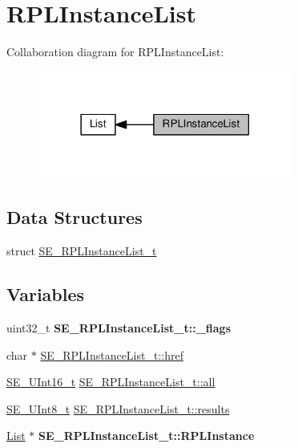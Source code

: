 \hypertarget{group__RPLInstanceList}{}\section{R\+P\+L\+Instance\+List}
\label{group__RPLInstanceList}
Collaboration diagram for R\+P\+L\+Instance\+List\+:\nopagebreak
\begin{figure}[H]
\begin{center}
\leavevmode
\includegraphics[width=237pt]{group__RPLInstanceList}
\end{center}
\end{figure}
\subsection*{Data Structures}
\begin{DoxyCompactItemize}
\item 
struct \hyperlink{structSE__RPLInstanceList__t}{S\+E\+\_\+\+R\+P\+L\+Instance\+List\+\_\+t}
\end{DoxyCompactItemize}
\subsection*{Variables}
\begin{DoxyCompactItemize}
\item 
\mbox{\label{group__RPLInstanceList_ga2f1292a8c00b7933ab76efb20bd4c02b}} 
uint32\+\_\+t {\bfseries S\+E\+\_\+\+R\+P\+L\+Instance\+List\+\_\+t\+::\+\_\+flags}
\item 
char $\ast$ \hyperlink{group__RPLInstanceList_ga5fd981ad39b39f7c4b6b6353ea9c322f}{S\+E\+\_\+\+R\+P\+L\+Instance\+List\+\_\+t\+::href}
\item 
\hyperlink{group__UInt16_gac68d541f189538bfd30cfaa712d20d29}{S\+E\+\_\+\+U\+Int16\+\_\+t} \hyperlink{group__RPLInstanceList_gaea547d1052c344346088c5fe12121667}{S\+E\+\_\+\+R\+P\+L\+Instance\+List\+\_\+t\+::all}
\item 
\hyperlink{group__UInt8_gaf7c365a1acfe204e3a67c16ed44572f5}{S\+E\+\_\+\+U\+Int8\+\_\+t} \hyperlink{group__RPLInstanceList_gab7df2e3cb4ec44c0ffbbb171e81f1c12}{S\+E\+\_\+\+R\+P\+L\+Instance\+List\+\_\+t\+::results}
\item 
\mbox{\label{group__RPLInstanceList_ga1b98d71c51176dff5547ade30203834b}} 
\hyperlink{structList}{List} $\ast$ {\bfseries S\+E\+\_\+\+R\+P\+L\+Instance\+List\+\_\+t\+::\+R\+P\+L\+Instance}
\end{DoxyCompactItemize}


